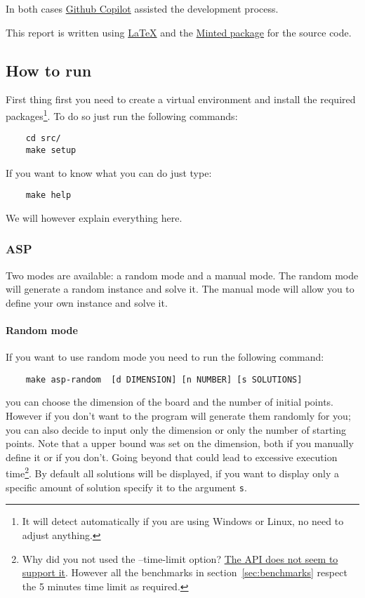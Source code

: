 In both cases \href{https://copilot.github.com/}{Github Copilot} assisted the development process.

This report is written using \href{https://www.latex-project.org/}{LaTeX} and the \href{https://ctan.org/pkg/minted?lang=en}{Minted package} for the source code.


\subsection{How to run}
First thing first you need to create a virtual environment and install the required packages\footnote{It will detect automatically if you are using Windows or Linux, no need to adjust anything.}. To do so just run the following commands:
\begin{verbatim}
    cd src/
    make setup
\end{verbatim}

If you want to know what you can do just type:

\begin{verbatim}
    make help 
\end{verbatim}

We will however explain everything here.

\subsubsection{ASP}
Two modes are available: a random mode and a manual mode. The random mode will generate a random instance and solve it. The manual mode will allow you to define your own instance and solve it.

\paragraph{Random mode}

If you want to use random mode you need to run the following command:
\begin{verbatim}
    make asp-random  [d DIMENSION] [n NUMBER] [s SOLUTIONS]
\end{verbatim}

you can choose the dimension of the board and the number of initial points. However if you don't want to the program will generate them randomly for you; you can also decide to input only the dimension or only the number of starting points. Note that a upper bound was set on the dimension, both if you manually define it or if you don't. Going beyond that could lead to excessive execution time\footnote{Why did you not used the --time-limit option? \href{https://github.com/potassco/clingo/issues/151}{The API does not seem to support it}. However all the benchmarks in section~\ref{sec:benchmarks} respect the 5 minutes time limit as required.}.
By default all solutions will be displayed, if you want to display only a specific amount of solution specify it to the argument \texttt{s}. 

